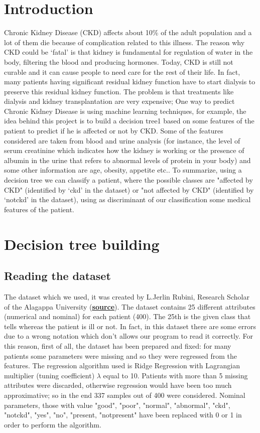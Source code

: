 \documentclass[a4paper,12pt,oneside,titlepage]{article}
\begin{document}
	\section{Introduction}
	Chronic Kidney Disease (CKD) affects about 10\% of the adult population and a lot of them die because of complication related to this illness. The reason why CKD could be ‘fatal’ is that kidney is fundamental for regulation of water in the body, filtering the blood and producing hormones. Today, CKD is still not curable and it can cause people to need care for the rest of their life. In fact, many patients having significant residual kidney function have to start dialysis to preserve this residual kidney function.
	The problem is that treatments like dialysis and kidney transplantation are very expensive; One way to predict Chronic Kidney Disease is using machine learning techniques, for example, the idea behind this project is to build a decision tree1 based on some features of the patient to predict if he is affected or not by CKD. Some of the features considered are taken from blood and urine analysis (for instance, the level of serum creatinine which indicates how the kidney is working or the presence of albumin in the urine that refers to abnormal levels of protein in your body) and some other information are age, obesity, appetite etc..
	To summarize, using a decision tree we can classify a patient, where the possible classes are "affected by CKD" (identified by ‘ckd’ in the dataset) or "not affected by CKD" (identified by ‘notckd’ in the dataset), using as discriminant of our classification some medical features of the patient.
	
	
	\section{Decision tree building}
	\subsection{Reading the dataset}
	The dataset which we used, it was created by L.Jerlin Rubini, Research Scholar of the Alagappa University (\href{https://archive.ics.uci.edu/ml/datasets/chronic_kidney_disease}{\textbf{\underline{source}}}).
	The dataset contains 25 different attributes (numerical and nominal) for each patient (400). The 25th is the given class that tells whereas the patient is ill or not.
	In fact, in this dataset there are some errors due to a wrong notation which don’t allows our program to read it correctly. For this reason, first of all, the dataset has been prepared and fixed: for many patients some parameters were missing and so they were regressed from the features. The regression algorithm used is Ridge Regression with Lagrangian multiplier (tuning coefficient) $\lambda$ equal to 10. Patients with more than 5 missing attributes were discarded, otherwise regression would have been too much approximative; so in the end 337 samples out of 400 were considered.
	Nominal parameters, those with value "good", "poor", "normal", "abnormal", "ckd", "notckd", "yes", "no", "present, "notpresent" have been replaced with 0 or 1 in order to perform the algorithm.
	
\end{document}
